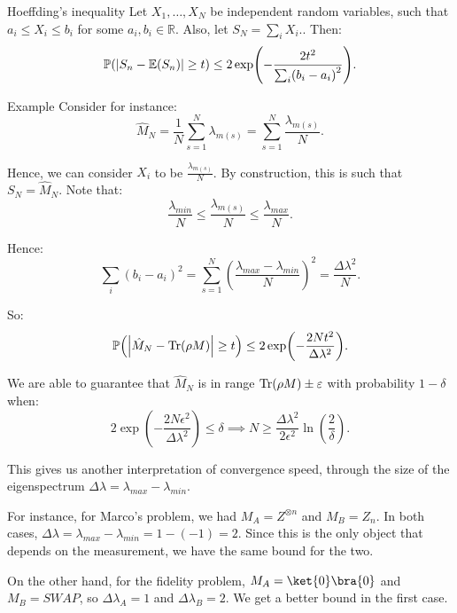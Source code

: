 \documentclass[a4paper]{article}
\begin{document}
\begin{parag}{Hoeffding's inequality}
    Let $X_1, \ldots, X_N$ be independent random variables, such that $a_i \leq X_i \leq b_i$ for some $a_i, b_i \in \mathbb{R}$. Also, let $S_N = \sum_{i} X_i .$. Then: 
    \[\prob\left(\left|S_n - \exval\left(S_n\right)\right| \geq t\right) \leq 2 \exp\left(-\frac{2 t^2}{\sum_{i} \left(b_i - a_i\right)^2}\right).\]

    \begin{subparag}{Example}
        Consider for instance: 
        \[\hat{M}_N = \frac{1}{N} \sum_{s=1}^{N} \lambda_{m\left(s\right)} = \sum_{s=1}^{N} \frac{\lambda_{m\left(s\right)}}{N}.\]

        Hence, we can consider $X_i$ to be $\frac{\lambda_{m\left(s\right)}}{N}$. By construction, this is such that $S_N = \hat{M}_N$. Note that: 
        \[\frac{\lambda_{min}}{N} \leq \frac{\lambda_{m\left(s\right)}}{N} \leq \frac{\lambda_{max}}{N}.\]
        
        Hence: 
        \[\sum_{i} \left(b_i - a_i\right)^2 = \sum_{s=1}^{N} \left(\frac{\lambda_{max} - \lambda_{min}}{N}\right)^2 = \frac{\Delta \lambda^2}{N}.\]

        So: 
        \[\prob\left(\left|\hat{M}_N - \Tr\left(\rho M\right)\right| \geq t\right) \leq 2 \exp\left(-\frac{2 N t^2}{\Delta \lambda^2}\right).\]
        
        We are able to guarantee that $\hat{M}_N$ is in range $\Tr\left(\rho M\right) \pm \epsilon$ with probability $1 - \delta$ when:
        \[2 \exp\left(-\frac{2 N \epsilon^2}{\Delta \lambda^2}\right) \leq \delta \implies N \geq \frac{\Delta \lambda^2}{2 \epsilon^2} \ln\left(\frac{2}{\delta}\right).\]

        This gives us another interpretation of convergence speed, through the size of the eigenspectrum $\Delta \lambda = \lambda_{max} - \lambda_{min}$.

        For instance, for Marco's problem, we had $M_A = Z^{\otimes n}$ and $M_B = Z_n$. In both cases, $\Delta \lambda = \lambda_{max} - \lambda_{min} = 1 - \left(-1\right) = 2$. Since this is the only object that depends on the measurement, we have the same bound for the two.

        On the other hand, for the fidelity problem, $M_A = \ket{0}\bra{0}$ and $M_B = SWAP$, so $\Delta \lambda_A = 1$ and $\Delta \lambda_B = 2$. We get a better bound in the first case.
    \end{subparag}
\end{parag}
\end{document}
